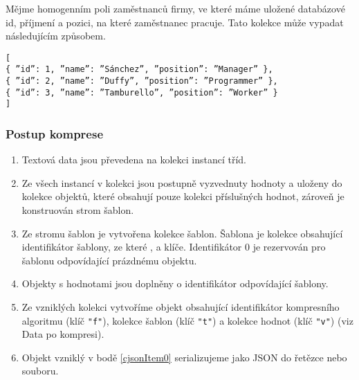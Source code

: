 Mějme homogenním poli zaměstnanců firmy, ve které máme uložené databázové id, příjmení a pozici, na které zaměstnanec pracuje. Tato kolekce může vypadat následujícím způsobem.

\texttt{[\\
\hspace*{5mm}\{ \textquotedblright id\textquotedblright : 1, \textquotedblright name\textquotedblright : \textquotedblright Sánchez\textquotedblright, \textquotedblright position\textquotedblright : \textquotedblright Manager\textquotedblright\ \},\\
\hspace*{5mm}\{ \textquotedblright id\textquotedblright : 2, \textquotedblright name\textquotedblright : \textquotedblright Duffy\textquotedblright, \textquotedblright position\textquotedblright : \textquotedblright Programmer\textquotedblright\ \},\\
\hspace*{5mm}\{ \textquotedblright id\textquotedblright : 3, \textquotedblright name\textquotedblright : \textquotedblright Tamburello\textquotedblright, \textquotedblright position\textquotedblright : \textquotedblright Worker\textquotedblright\ \}\\
]}

\subsubsection{Postup komprese}
\begin{enumerate}
\item Textová data jsou převedena na kolekci instancí tříd.
\item Ze všech instancí v kolekci jsou postupně vyzvednuty hodnoty a uloženy do kolekce objektů, které obsahují pouze kolekci příslušných hodnot, zároveň je konstruován strom šablon.
\item Ze stromu šablon je vytvořena kolekce šablon. Šablona je kolekce obsahující identifikátor šablony, ze které , a klíče. Identifikátor 0 je rezervován pro šablonu odpovídající prázdnému objektu.
\item Objekty s hodnotami jsou doplněny o identifikátor odpovídající šablony.
\item \label{cjsonItem0}Ze vzniklých kolekci vytvoříme objekt obsahující identifikátor kompresního algoritmu (klíč \texttt{"f"}), kolekce šablon (klíč \texttt{"t"}) a kolekce hodnot (klíč \texttt{"v"}) (viz Data po kompresi).
\item Objekt vzniklý v bodě \ref{cjsonItem0} serializujeme jako JSON do řetězce nebo souboru.
\end{enumerate}

